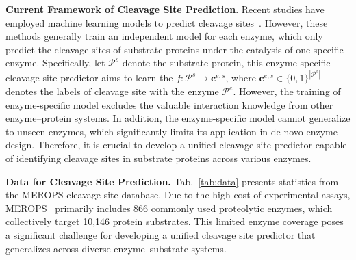 









\textbf{Current Framework of Cleavage Site Prediction}.  Recent studies have employed machine learning models to predict cleavage sites~\cite{WANG2024309, ScreenCap3, SitePrediction, DeepCleave, procleave}. However, these methods generally train an independent model for each enzyme, which only predict the cleavage sites of substrate proteins under the catalysis of one specific enzyme. Specifically, let $\mathcal{P}^s$ denote the  substrate protein, this enzyme-specific cleavage site predictor aims to learn the $f: \mathcal{P}^s \rightarrow \mathbf{c}^{e,s}$, where $\mathbf{c}^{e,s} \in \{0,1\}^{|\mathcal{P}^s|}$ denotes the labels of cleavage site with the enzyme $\mathcal{P}^e$.
However, the training of enzyme-specific model excludes the valuable interaction knowledge from other enzyme–protein systems. In addition, the enzyme-specific model cannot generalize to unseen enzymes, which significantly limits its application in de novo enzyme design. Therefore, it is crucial to develop a unified cleavage site predictor capable of identifying cleavage sites in substrate proteins across various enzymes.





\textbf{Data for Cleavage Site Prediction.}
Tab.~\ref{tab:data} presents statistics from the MEROPS cleavage site database. Due to the high cost of experimental assays, MEROPS~\cite{Merops} primarily includes 866 commonly used proteolytic enzymes, which collectively target 10,146 protein substrates. This limited enzyme coverage poses a significant challenge for developing a unified cleavage site predictor that generalizes across diverse enzyme–substrate systems.






